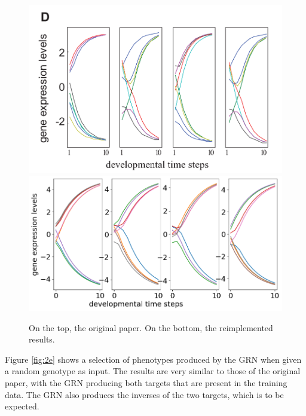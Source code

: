 \documentclass[twocolumn,a4paper,11pt]{article}
\begin{document}
    \begin{figure}[h]
        \centering
        \includegraphics[width=0.9\linewidth]{orig_img/fig2d.png}
        \includegraphics[width=0.9\linewidth]{img/fig2d.png}
        \caption{On the top, the original paper. On the bottom, the reimplemented results.} \label{fig:2d}
    \end{figure}

    Figure \ref{fig:2e} shows a selection of phenotypes produced by the GRN when given a random genotype as input. The results are very similar to those of the original paper, with the GRN producing both targets that are present in the training data. The GRN also produces the inverses of the two targets, which is to be expected.
\end{document}
